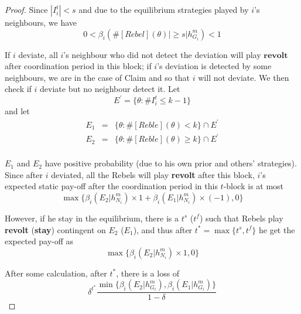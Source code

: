 \documentclass[12pt,letter]{article}
\theoremstyle{definition}
\theoremstyle{remark}
\theoremstyle{claim}
\begin{document}
\begin{proof}
Since $|I^t_i|<s$ and due to the equilibrium strategies played by $i$'s neighbours, we have 
\[0<\beta_{i}(\#[Rebel](\theta)|\geq s|h^{m}_{G_i})<1\]

If $i$ deviate, all $i$'s neighbour who did not detect the deviation will play $\textbf{revolt}$ after coordination period in this block; if $i$'s deviation is detected by some neighbours, we are in the case of Claim and so that $i$ will not deviate. We then check if $i$ deviate but no neighbour detect it.
Let 
\[E^{'}=\{\theta:\#I^{t}_i\leq k-1\}\]
and let 
\begin{eqnarray*}
E_1&=&\{\theta: \#[Reble](\theta)<k\}\cap E^{'}\\
E_2&=&\{\theta: \#[Reble](\theta)\geq k\}\cap E^{'}\\
\end{eqnarray*}

$E_1$ and $E_2$ have positive probability (due to his own prior and others' strategies). Since after $i$ deviated, all the Rebels will play \textbf{revolt} after this block, $i$'s expected static pay-off after the coordination period in this $t$-block is at most 
\[
{\max\{\beta_{i}(E_2|h^{m}_{N_i})\times 1+\beta_{i}(E_1|h^{m}_{N_i})\times (-1), 0\}}
\]

However, if he stay in the equilibrium, there is a $t^s$ ($t^f$) such that Rebels play \textbf{revolt} (\textbf{stay}) contingent on $E_2$ ($E_1$), and thus after $t^*=\max\{t^s,t^f\}$ he get the expected pay-off as
\[
{\max\{\beta_{i}(E_2|h^{m}_{N_i})\times 1, 0\}}
\]

After some calculation, after $t^*$, there is a loss of
\[\delta^{t^{*}}\frac{\min\{\beta_{i}(E_2|h^{m}_{G_i}),\beta_{i}(E_1|h^{m}_{G_i})\}}{1-\delta}\]

\end{proof}
\end{document}
